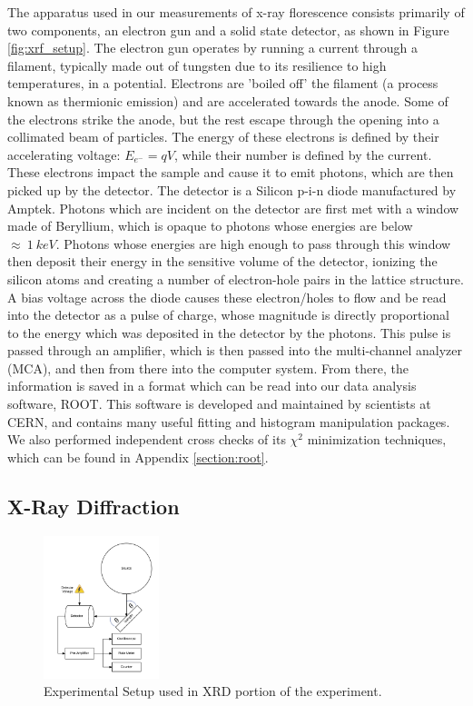 \documentclass[%
 reprint,
 amsmath,amssymb,
 aps,
 pra,
]{revtex4-1}
\begin{document}
The apparatus used in our measurements of x-ray florescence consists primarily of two components, an electron gun and a solid state detector, as shown in Figure \ref{fig:xrf_setup}. The electron gun operates by running a current through a filament, typically made out of tungsten due to its resilience to high temperatures, in a potential. Electrons are 'boiled off' the filament (a process known as thermionic emission) and are accelerated towards the anode. Some of the electrons strike the anode, but the rest escape through the opening into a collimated beam of particles. The energy of these electrons is defined by their accelerating voltage: $E_{e^-} = qV$, while their number is defined by the current.  These electrons impact the sample and cause it to emit photons, which are then picked up by the detector. The detector is a Silicon p-i-n diode manufactured by Amptek. Photons which are incident on the detector are first met with a window made of Beryllium, which is opaque to photons whose energies are below $\approx ~1~keV$. Photons whose energies are high enough to pass through this window then deposit their energy in the sensitive volume of the detector, ionizing the silicon atoms and creating a number of electron-hole pairs in the lattice structure. A bias voltage across the diode causes these electron/holes to flow and be read into the detector as a pulse of charge, whose magnitude is directly proportional to the energy which was deposited in the detector by the photons. This pulse is passed through an amplifier, which is then passed into the multi-channel analyzer (MCA), and then from there into the computer system. From there, the information is saved in a format which can be read into our data analysis software, ROOT. This software is developed and maintained by scientists at CERN, and contains many useful fitting and histogram manipulation packages. We also performed independent cross checks of its $\chi^2$ minimization techniques, which can be found in Appendix \ref{section:root}.

\subsection{X-Ray Diffraction}

\begin{figure}[H]
	\centering
	\includegraphics[width=0.3\textwidth]{xrd_experiment.png}
	\caption{Experimental Setup used in XRD portion of the experiment.}
	\label{fig:xrd_setup}
\end{figure}
\end{document}
